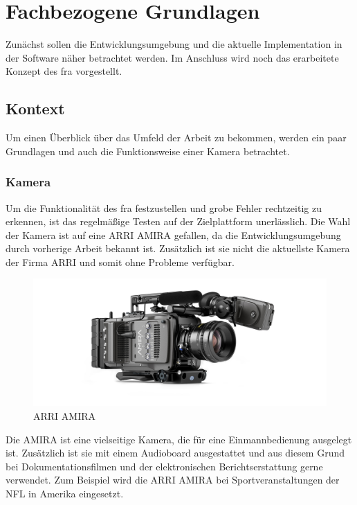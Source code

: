 \chapter{Fachbezogene Grundlagen} \label{sec:fachgrund}
Zunächst sollen die Entwicklungsumgebung und die aktuelle Implementation in der Software näher betrachtet werden. Im Anschluss wird noch das erarbeitete Konzept des \ac{fra} vorgestellt.

\section{Kontext}
Um einen Überblick über das Umfeld der Arbeit zu bekommen, werden ein paar Grundlagen und auch die Funktionsweise einer Kamera betrachtet. 

\subsection{Kamera}
Um die Funktionalität des \ac{fra} festzustellen und grobe Fehler rechtzeitig zu erkennen, ist das regelmäßige Testen auf der Zielplattform unerlässlich. 
Die Wahl der Kamera ist auf eine ARRI AMIRA gefallen, da die Entwicklungsumgebung durch vorherige Arbeit bekannt ist. Zusätzlich ist sie nicht die aktuellste Kamera der Firma \ac{ARRI} und somit ohne Probleme verfügbar.

\begin{figure}[!hbtp]
	\centering
	\includegraphics[width = 0.7\linewidth]{pictures/amira-product-image-data.jpg}
	\smallskip
	\caption{ARRI AMIRA \protect\footnotemark[2]}
	\label{fig:amira}
\end{figure}  

Die AMIRA ist eine vielseitige Kamera, die für eine Einmannbedienung ausgelegt ist.
Zusätzlich ist sie mit einem Audioboard ausgestattet und aus diesem Grund bei Dokumentationsfilmen und der elektronischen Berichtserstattung gerne verwendet. Zum Beispiel wird die ARRI AMIRA bei Sportveranstaltungen der NFL in Amerika eingesetzt. \cite{arrinewsamira} 

